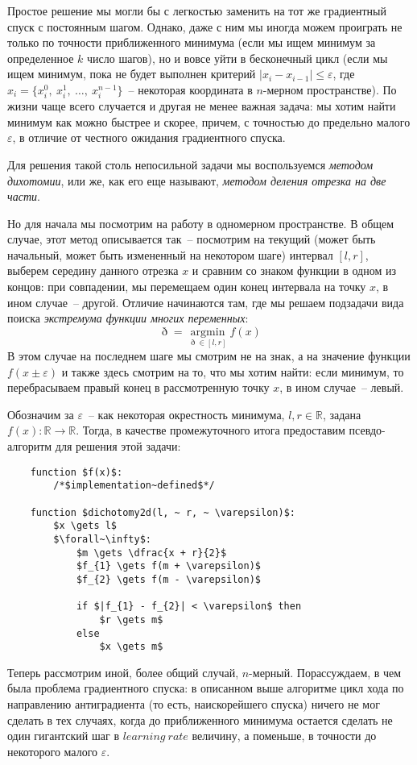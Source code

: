 \documentclass[12pt, a4paper, oneside]{article}
\begin{document}
	Простое решение мы могли бы с легкостью заменить на тот же градиентный спуск с постоянным шагом. Однако, даже с ним мы иногда можем проиграть не только по точности приближенного минимума (если мы ищем минимум за определенное $k$ число шагов), но и вовсе уйти в бесконечный цикл (если мы ищем минимум, пока не будет выполнен критерий $|x_{i} - x_{i - 1}| \leqslant \varepsilon$, где $x_{i} = \{x^0_{i}, ~ x^1_{i}, ~ \ldots, ~ x^{n - 1}_i\}$~-- некоторая координата в $n$-мерном пространстве). По жизни чаще всего случается и другая не менее важная задача: мы хотим найти минимум как можно быстрее и скорее, причем, с точностью до предельно малого $\varepsilon$, в отличие от честного ожидания градиентного спуска.

	Для решения такой столь непосильной задачи мы воспользуемся \textit{методом дихотомии}, или же, как его еще называют, \textit{методом деления отрезка на две части}.

	Но для начала мы посмотрим на работу в одномерном пространстве. В общем случае, этот метод описывается так~-- посмотрим на текущий (может быть начальный, может быть измененный на некотором шаге) интервал $[l, r]$, выберем середину данного отрезка $x$ и сравним со знаком функции в одном из концов: при совпадении, мы перемещаем один конец интервала на точку $x$, в ином случае~-- другой. Отличие начинаются там, где мы решаем подзадачи вида поиска \textit{экстремума функции многих переменных}:
	\[
		\eth = \operatorname*{argmin}_{\eth \in [l, r]}{f(x)}
	\]
	В этом случае на последнем шаге мы смотрим не на знак, а на значение функции $f(x \pm \varepsilon)$ и также здесь смотрим на то, что мы хотим найти: если минимум, то перебрасываем правый конец в рассмотренную точку $x$, в ином случае~-- левый.

	Обозначим за $\varepsilon$~-- как некоторая окрестность минимума, $l, r \in \mathbb{R}$, задана $f(x) : \mathbb{R} \to \mathbb{R}$. Тогда, в качестве промежуточного итога предоставим псевдо-алгоритм для решения этой задачи:
	\begin{lstlisting}
	function $f(x)$:
		/*$implementation~defined$*/

	function $dichotomy2d(l, ~ r, ~ \varepsilon)$:
		$x \gets l$
		$\forall~\infty$:
			$m \gets \dfrac{x + r}{2}$
			$f_{1} \gets f(m + \varepsilon)$
			$f_{2} \gets f(m - \varepsilon)$

			if $|f_{1} - f_{2}| < \varepsilon$ then
				$r \gets m$
			else
				$x \gets m$
	\end{lstlisting}
	Теперь рассмотрим иной, более общий случай, $n$-мерный. Порассуждаем, в чем была проблема градиентного спуска: в описанном выше алгоритме цикл хода по направлению антиградиента (то есть, наискорейшего спуска) ничего не мог сделать в тех случаях, когда до приближенного минимума остается сделать не один гигантский шаг в $learning~rate$ величину, а поменьше, в точности до некоторого малого $\varepsilon$.
\end{document}
